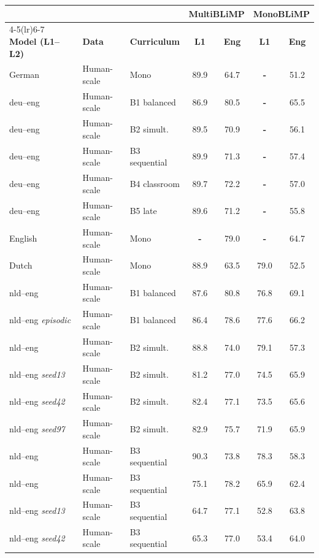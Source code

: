 \begin{table}[t]
\centering\small
\setlength{\tabcolsep}{4pt}
\begin{tabular}{lll cc cc}
\toprule
& & & \multicolumn{2}{c}{\textbf{MultiBLiMP}} & \multicolumn{2}{c}{\textbf{MonoBLiMP}} \\
\cmidrule(lr){4-5}\cmidrule(lr){6-7}
\textbf{Model (L1--L2)} & \textbf{Data} & \textbf{Curriculum} & \textbf{L1} & \textbf{Eng} & \textbf{L1} & \textbf{Eng} \\
\midrule
German & Human-scale & Mono & 89.9 & 64.7 & \textbf{-} & 51.2 \\
deu--eng & Human-scale & B1 balanced & 86.9 & 80.5 & \textbf{-} & 65.5 \\
deu--eng & Human-scale & B2 simult. & 89.5 & 70.9 & \textbf{-} & 56.1 \\
deu--eng & Human-scale & B3 sequential & 89.9 & 71.3 & \textbf{-} & 57.4 \\
deu--eng & Human-scale & B4 classroom & 89.7 & 72.2 & \textbf{-} & 57.0 \\
deu--eng & Human-scale & B5 late & 89.6 & 71.2 & \textbf{-} & 55.8 \\
English & Human-scale & Mono & \textbf{-} & 79.0 & \textbf{-} & 64.7 \\
Dutch & Human-scale & Mono & 88.9 & 63.5 & 79.0 & 52.5 \\
nld--eng & Human-scale & B1 balanced & 87.6 & 80.8 & 76.8 & 69.1 \\
nld--eng {\scriptsize\textit{episodic}} & Human-scale & B1 balanced & 86.4 & 78.6 & 77.6 & 66.2 \\
nld--eng & Human-scale & B2 simult. & 88.8 & 74.0 & 79.1 & 57.3 \\
nld--eng {\scriptsize\textit{seed13}} & Human-scale & B2 simult. & 81.2 & 77.0 & 74.5 & 65.9 \\
nld--eng {\scriptsize\textit{seed42}} & Human-scale & B2 simult. & 82.4 & 77.1 & 73.5 & 65.6 \\
nld--eng {\scriptsize\textit{seed97}} & Human-scale & B2 simult. & 82.9 & 75.7 & 71.9 & 65.9 \\
nld--eng & Human-scale & B3 sequential & 90.3 & 73.8 & 78.3 & 58.3 \\
nld--eng  & Human-scale & B3 sequential & 75.1 & 78.2 & 65.9 & 62.4 \\
nld--eng {\scriptsize\textit{seed13}} & Human-scale & B3 sequential & 64.7 & 77.1 & 52.8 & 63.8 \\
nld--eng {\scriptsize\textit{seed42}} & Human-scale & B3 sequential & 65.3 & 77.0 & 53.4 & 64.0 \\

\end{tabular}
\end{table}
